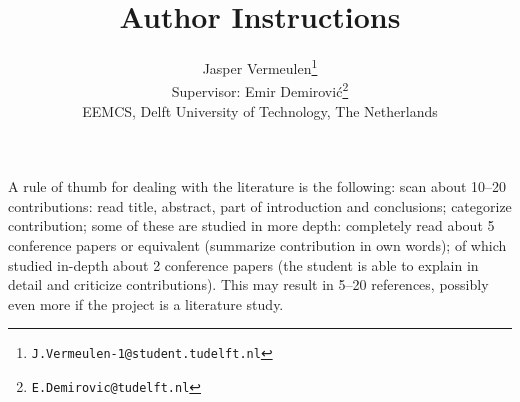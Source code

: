 \documentclass[english]{article}
\begin{document}
\title{Author Instructions}

\author{Jasper Vermeulen\footnote{\texttt{J.Vermeulen-1@student.tudelft.nl}}\\
Supervisor: Emir Demirović\footnote{\texttt{E.Demirovic@tudelft.nl}}\\
EEMCS, Delft University of Technology, The Netherlands
}


\maketitle























A rule of thumb for dealing with the literature is the following: scan about 10--20 contributions: read title, abstract, part of introduction and conclusions; categorize contribution; some of these are studied in more depth: completely read about 5 conference papers or equivalent (summarize contribution in own words); of which studied in-depth about 2 conference papers (the student is able to explain in detail and criticize contributions). This may result in 5--20 references, possibly even more if the project is a literature study.
\end{document}

